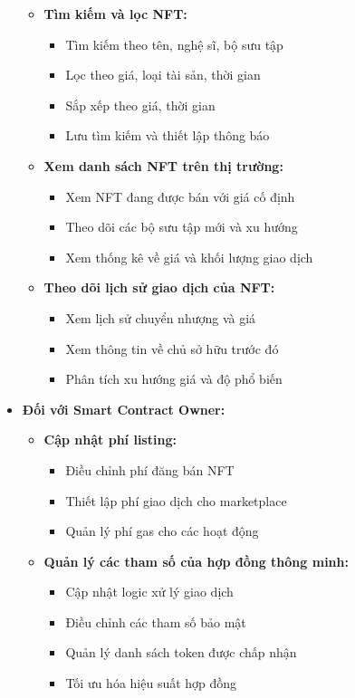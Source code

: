 \begin{itemize}
\begin{itemize}
        \item \textbf{Tìm kiếm và lọc NFT:}
        \begin{itemize}
            \item Tìm kiếm theo tên, nghệ sĩ, bộ sưu tập
            \item Lọc theo giá, loại tài sản, thời gian
            \item Sắp xếp theo giá, thời gian
            \item Lưu tìm kiếm và thiết lập thông báo
        \end{itemize}
        
        \item \textbf{Xem danh sách NFT trên thị trường:}
        \begin{itemize}
            \item Xem NFT đang được bán với giá cố định
            \item Theo dõi các bộ sưu tập mới và xu hướng
            \item Xem thống kê về giá và khối lượng giao dịch
        \end{itemize}
        
        \item \textbf{Theo dõi lịch sử giao dịch của NFT:}
        \begin{itemize}
            \item Xem lịch sử chuyển nhượng và giá
            \item Xem thông tin về chủ sở hữu trước đó
            \item Phân tích xu hướng giá và độ phổ biến
        \end{itemize}
    \end{itemize}
    
    \item \textbf{Đối với Smart Contract Owner:}
    \begin{itemize}
        \item \textbf{Cập nhật phí listing:}
        \begin{itemize}
            \item Điều chỉnh phí đăng bán NFT
            \item Thiết lập phí giao dịch cho marketplace
            \item Quản lý phí gas cho các hoạt động
        \end{itemize}
        
        \item \textbf{Quản lý các tham số của hợp đồng thông minh:}
        \begin{itemize}
            \item Cập nhật logic xử lý giao dịch
            \item Điều chỉnh các tham số bảo mật
            \item Quản lý danh sách token được chấp nhận
            \item Tối ưu hóa hiệu suất hợp đồng
        \end{itemize}
    \end{itemize}
\end{itemize} 